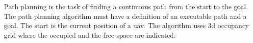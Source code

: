 Path planning is the task of finding a continuous path from the start to the goal. The path planning algorithm must have a definition of an executable path and a goal. The start is the current position of a \acs{uav}. The algorithm uses \acs{3d} occupancy grid where the occupied and the free space are indicated. \cite{KLANCAR2017161}